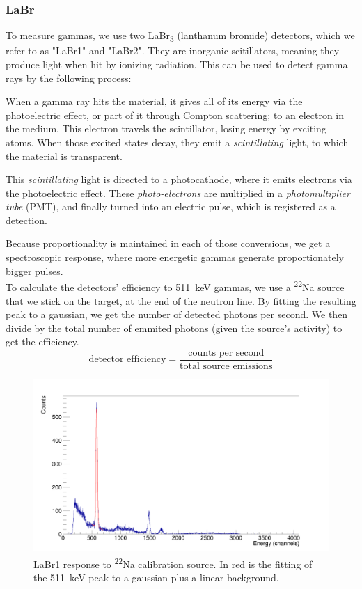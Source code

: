 \documentclass[a4paper,12pt]{report}
\newcommand{\Na}{\textsuperscript{22}Na }
\begin{document}
\subsubsection{LaBr}
To measure gammas, we use two LaBr\textsubscript{3} (lanthanum bromide) detectors, which we refer to as "LaBr1" and "LaBr2".
They are inorganic scitillators, meaning they produce light when hit by ionizing radiation.
This can be used to detect gamma rays by the following process:

When a gamma ray hits the material, it gives all of its energy via the photoelectric effect, or part of it through Compton scattering; to an electron in the medium.
This electron travels the scintillator, losing energy by exciting atoms.
When those excited states decay, they emit a \textit{scintillating} light, to which the material is transparent.

This \textit{scintillating} light is directed to a photocathode, where it emits electrons via the photoelectric effect.
These \textit{photo-electrons} are multiplied in a \textit{photomultiplier tube} (PMT), and finally turned into an electric pulse, which is registered as a detection.

Because proportionality is maintained in each of those conversions, we get a spectroscopic response, where more energetic gammas generate proportionately bigger pulses.
\\

To calculate the detectors' efficiency to \qty{511}{\keV} gammas, we use a \Na source that we stick on the target, at the end of the neutron line.
By fitting the resulting peak to a gaussian, we get the number of detected photons per second.
We then divide by the total number of emmited photons (given the source's activity) to get the efficiency.
\begin{equation}
	\text{detector efficiency} = \frac{\text{counts per second}}{\text{total source emissions}}
\end{equation}

\begin{figure}[H]
	\centering
	\includegraphics[width=\textwidth]{labr_na22_calibration.png}
	\caption{LaBr1 response to \Na calibration source. In red is the fitting of the \qty{511}{\keV} peak to a gaussian plus a linear background.}
	\label{labr_na22_calibration}
\end{figure}
\end{document}
